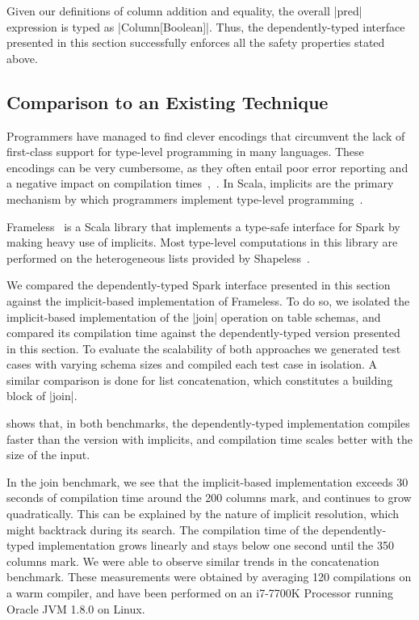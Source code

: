 \noindent
Given our definitions of column addition and equality, the overall |pred| expression is typed as |Column[Boolean]|.
Thus, the dependently-typed interface presented in this section successfully enforces all the safety properties stated above.

\subsection{Comparison to an Existing Technique}


Programmers have managed to find clever encodings that circumvent the lack of first-class support for type-level programming in many languages.
These encodings can be very cumbersome, as they often entail poor error reporting and a negative impact on compilation times~\citep{mcbride2002faking},~\citep{kiselyov2004strongly}.
In Scala, implicits are the primary mechanism by which programmers implement type-level programming~\citep{odersky2018simplicitly}.

Frameless~\citep{blanvillain2016frameless} is a Scala library that implements a type-safe interface for Spark by making heavy use of implicits.
Most type-level computations in this library are performed on the heterogeneous lists provided by Shapeless~\citep{sabin2011shapeless}.

We compared the dependently-typed Spark interface presented in this section against the implicit-based implementation of Frameless.
To do so, we isolated the implicit-based implementation of the |join| operation on table schemas, and compared its compilation time against the dependently-typed version presented in this section.
To evaluate the scalability of both approaches we generated test cases with varying schema sizes and compiled each test case in isolation.
A similar comparison is done for list concatenation, which constitutes a building block of |join|.

 shows that, in both benchmarks, the dependently-typed implementation compiles faster than the version with implicits, and compilation time scales better with the size of the input.

In the join benchmark, we see that the implicit-based implementation exceeds 30 seconds of compilation time around the 200 columns mark, and continues to grow quadratically.
This can be explained by the nature of implicit resolution, which might backtrack during its search.
The compilation time of the dependently-typed implementation grows linearly and stays below one second until the 350 columns mark.
We were able to observe similar trends in the concatenation benchmark.
These measurements were obtained by averaging 120 compilations on a warm compiler, and have been performed on an i7-7700K Processor running Oracle JVM 1.8.0 on Linux.

